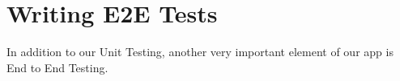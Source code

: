\maketitle{}
\section{ Writing E2E Tests }

In addition to our Unit Testing, another very important element of our app is
End to End Testing.
